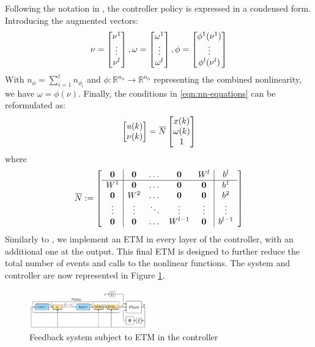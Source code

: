\documentclass{ifacconf}
\theoremstyle{plain}
\begin{document}
Following the notation in \cite{css-paper}, the controller policy is expressed in a condensed form. Introducing the augmented vectors:
\begin{equation*}
  \nu = \left[\begin{matrix}\nu^1 \\ \vdots \\ \nu^l\end{matrix}\right], \omega = \left[\begin{matrix}\omega^1 \\ \vdots \\ \omega^l\end{matrix}\right], \phi = \left[\begin{matrix}\phi^1(\nu^1) \\ \vdots \\ \phi^l(\nu^l)\end{matrix}\right] 
\end{equation*}
With $n_{\phi} = \sum_{i=1}^{l} n_{\phi_i}$ and $\phi: \mathbb{R}^{n_{\phi}} \to \mathbb{R}^{n_{\phi}}$ representing the combined nonlinearity, we have $\omega = \phi(\nu)$. Finally, the conditions in \eqref{eqn:nn-equations} can be reformulated as:
\begin{equation*}
  \bmx{u(k)\\ \nu(k)} = \overbar N \bmx{x(k) \\ \omega(k) \\ 1} 
\end{equation*}
where
\begin{equation}\label{eqn:first-N}
  \overbar N := \bmx{
    \begin{array}{c | c c c c | c}
      \0 & \0 & \dots & \0 & W^l & b^l \\ 
      \hline
      W^1 & \0 & \dots & \0 & \0 & b^1 \\
      \0 & W^2 & \dots & \0 & \0 & b^2 \\
      \vdots & \vdots & \ddots & \vdots & \vdots & \vdots \\
      \0 & \0 & \dots & W^{l-1} & \0 & b^{l-1}
    \end{array}
  }
\end{equation}
Similarly to \cite{css-extended}, we implement an ETM in every layer of the controller, with an additional one at the output. This final ETM is designed to further reduce the total number of events and calls to the nonlinear functions. The system and controller are now represented in Figure \ref{fig:second_scheme}.
\begin{figure}[H]
    \centering
    \includegraphics[width=0.45\textwidth]{Figures/second_scheme}
    \centering
    \caption{Feedback system subject to ETM in the controller}
    \label{fig:second_scheme}
\end{figure}
\end{document}
